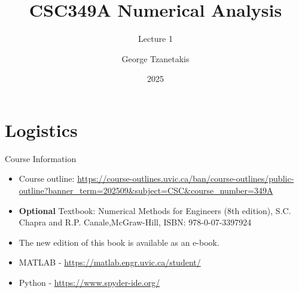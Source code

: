 \documentclass[12pt]{beamer}
\title[CSC349A Numerical Analysis]{CSC349A Numerical Analysis}
\subtitle[Leture 1]{Lecture 1}
\date[2025]{2025}
\author[G. Tzanetakis]{George Tzanetakis}
\institute[University of Victoria]{University of Victoria}
\begin{document}
\frame{\maketitle} %




\section{Logistics} 

\begin{frame}{Course Information} 
\begin{itemize} 
\item{Course outline: \url{https://course-outlines.uvic.ca/ban/course-outlines/public-outline?banner_term=202509&subject=CSC&course_number=349A}}
\item{{\bf Optional} Textbook: Numerical Methods for Engineers  (8th edition), S.C. Chapra and R.P. Canale,McGraw-Hill, ISBN: 978-0-07-3397924 }
\item{The new edition of this book is available as an e-book.}
\item{ MATLAB - \url{https://matlab.engr.uvic.ca/student/}}
\item{ Python - \url{https://www.spyder-ide.org/}}
\end{itemize} 
\end{frame} 
\end{document}
